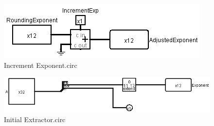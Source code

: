 \documentclass[18pt]{article}
\begin{document}
\begin{figure}[!h]
    \centering
    \captionsetup{font=Large}
    \includegraphics[scale=0.5]{Util/IncrementExponent.png}
    \caption{Increment Exponent.circ}
\end{figure}
\begin{figure}[!h]
    \centering
    \captionsetup{font=Large}
    \includegraphics[scale=0.5]{Util/InitialExtractor.png}
    \caption{Initial Extractor.circ}
\end{figure}
\newpage
\end{document}
